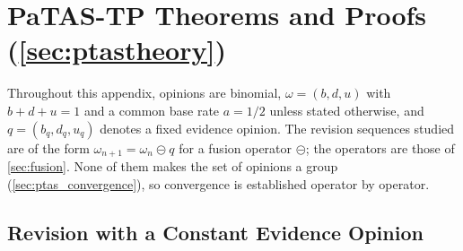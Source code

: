 
\chapter{\ac{PaTAS-TP} Theorems and Proofs (\cref{sec:ptastheory})}\label{app:proof}

Throughout this appendix, opinions are binomial, $\omega = (b, d, u)$ with $b + d + u = 1$ and a common base rate $a = 1/2$ unless stated otherwise, and $q = (b_q, d_q, u_q)$ denotes a fixed evidence opinion. The revision sequences studied are of the form $\omega_{n+1} = \omega_n \circleddash q$ for a fusion operator $\circleddash$; the operators are those of \cref{sec:fusion}. None of them makes the set of opinions a group (\cref{sec:ptas_convergence}), so convergence is established operator by operator.

\section{Revision with a Constant Evidence Opinion}

